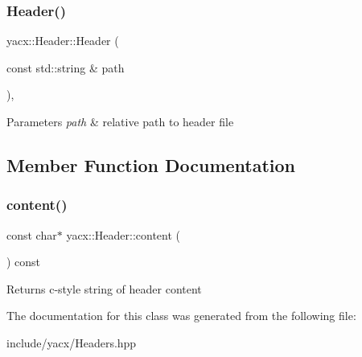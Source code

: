 \subsubsection{\texorpdfstring{Header()}{Header()}}
{\footnotesize\ttfamily yacx\+::\+Header\+::\+Header (\begin{DoxyParamCaption}\item[{const std\+::string \&}]{path }\end{DoxyParamCaption})\hspace{0.3cm}{\ttfamily [inline]}, {\ttfamily [explicit]}}


\begin{DoxyParams}{Parameters}
{\em path} & relative path to header file \\
\hline
\end{DoxyParams}


\subsection{Member Function Documentation}
\mbox{\label{classyacx_1_1_header_a6c16e8736a35b1644dfdf9caebee7ad5}} 
\subsubsection{\texorpdfstring{content()}{content()}}
{\footnotesize\ttfamily const char$\ast$ yacx\+::\+Header\+::content (\begin{DoxyParamCaption}{ }\end{DoxyParamCaption}) const\hspace{0.3cm}{\ttfamily [inline]}}

\begin{DoxyReturn}{Returns}
c-\/style string of header content 
\end{DoxyReturn}


The documentation for this class was generated from the following file\+:\begin{DoxyCompactItemize}
\item 
include/yacx/Headers.\+hpp\end{DoxyCompactItemize}
